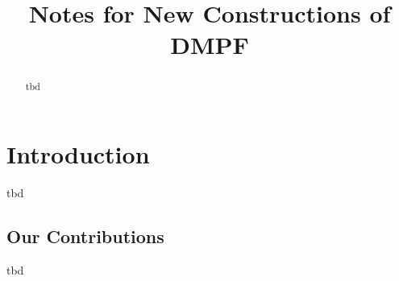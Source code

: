\documentclass[conference,compsoc]{IEEEtran}
\begin{document}
\title{Notes for New Constructions of DMPF}

\maketitle
\begin{abstract}
  tbd
\end{abstract}

\thispagestyle{plain}
\pagestyle{plain}

\section{Introduction}
tbd
\subsection{Our Contributions}
tbd















\appendices


%
\end{document}
